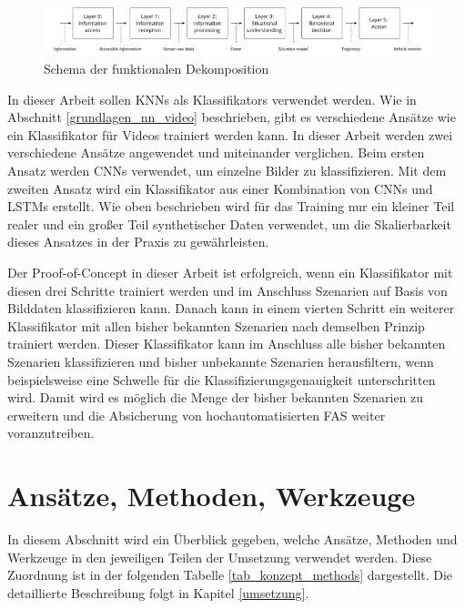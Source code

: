 \begin{figure}[h]
\centering
\includegraphics[scale=0.45]{images/funktionale_dekomposition.pdf}
\caption[Schema der funktionalen Dekomposition]{Schema der funktionalen Dekomposition \cite{amersbach2017functional}}
\label{fig_functional_decomposition}
\end{figure}

In dieser Arbeit sollen \acp{KNN} als Klassifikators verwendet werden. Wie in Abschnitt \ref{grundlagen_nn_video} beschrieben, gibt es verschiedene Ansätze wie ein Klassifikator für Videos trainiert werden kann. In dieser Arbeit werden zwei verschiedene Ansätze angewendet und miteinander verglichen. Beim ersten Ansatz werden \acp{CNN} verwendet, um einzelne Bilder zu klassifizieren. Mit dem zweiten Ansatz wird ein Klassifikator aus einer Kombination von \acp{CNN} und \acp{LSTM} erstellt. Wie oben beschrieben wird für das Training nur ein kleiner Teil realer und ein großer Teil synthetischer Daten verwendet, um die Skalierbarkeit dieses Ansatzes in der Praxis zu gewährleisten.

Der Proof-of-Concept in dieser Arbeit ist erfolgreich, wenn ein Klassifikator mit diesen drei Schritte trainiert werden und im Anschluss Szenarien auf Basis von Bilddaten klassifizieren kann. Danach kann in einem vierten Schritt ein weiterer Klassifikator mit allen bisher bekannten Szenarien nach demselben Prinzip trainiert werden. Dieser Klassifikator kann im Anschluss alle bisher bekannten Szenarien klassifizieren und bisher unbekannte Szenarien herausfiltern, wenn beispielsweise eine Schwelle für die Klassifizierungsgenauigkeit unterschritten wird. Damit wird es möglich die Menge der bisher bekannten Szenarien zu erweitern und die Absicherung von hochautomatisierten \ac{FAS} weiter voranzutreiben.

\section{Ansätze, Methoden, Werkzeuge}
\label{konzept_methodik}

In diesem Abschnitt wird ein Überblick gegeben, welche Ansätze, Methoden und Werkzeuge in den jeweiligen Teilen der Umsetzung verwendet werden. Diese Zuordnung ist in der folgenden Tabelle \ref{tab_konzept_methods} dargestellt. Die detaillierte Beschreibung folgt in Kapitel \ref{umsetzung}.

